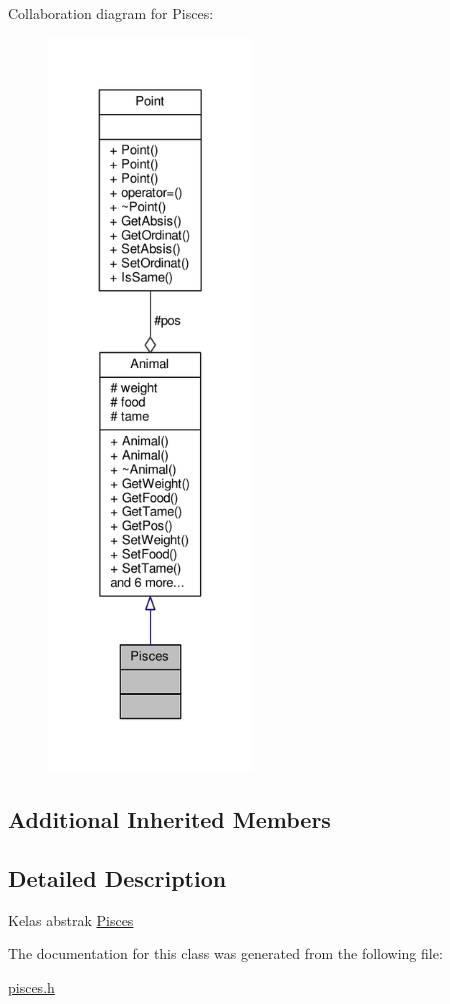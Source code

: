Collaboration diagram for Pisces\+:
\nopagebreak
\begin{figure}[H]
\begin{center}
\leavevmode
\includegraphics[height=550pt]{classPisces__coll__graph}
\end{center}
\end{figure}
\subsection*{Additional Inherited Members}


\subsection{Detailed Description}
Kelas abstrak \hyperlink{classPisces}{Pisces} 

The documentation for this class was generated from the following file\+:\begin{DoxyCompactItemize}
\item 
\hyperlink{pisces_8h}{pisces.\+h}\end{DoxyCompactItemize}

